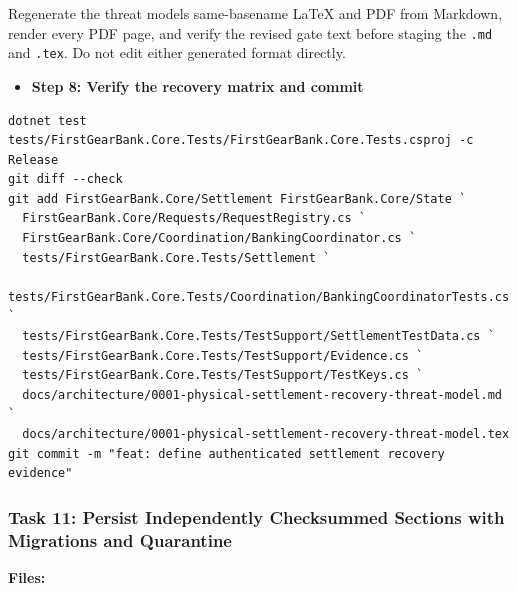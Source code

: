 \documentclass[
  10pt,
  letterpaper,
]{article}
\newcommand{\passthrough}[1]{#1}
\providecommand{\tightlist}{%
  \setlength{\itemsep}{0pt}\setlength{\parskip}{0pt}}
\begin{document}
Regenerate the threat model\textquotesingle s same-basename LaTeX and
PDF from Markdown, render every PDF page, and verify the revised gate
text before staging the \passthrough{\lstinline!.md!} and
\passthrough{\lstinline!.tex!}. Do not edit either generated format
directly.

\begin{itemize}
\tightlist
\item[$\square$]
  \textbf{Step 8: Verify the recovery matrix and commit}
\end{itemize}

\begin{lstlisting}
dotnet test tests/FirstGearBank.Core.Tests/FirstGearBank.Core.Tests.csproj -c Release
git diff --check
git add FirstGearBank.Core/Settlement FirstGearBank.Core/State `
  FirstGearBank.Core/Requests/RequestRegistry.cs `
  FirstGearBank.Core/Coordination/BankingCoordinator.cs `
  tests/FirstGearBank.Core.Tests/Settlement `
  tests/FirstGearBank.Core.Tests/Coordination/BankingCoordinatorTests.cs `
  tests/FirstGearBank.Core.Tests/TestSupport/SettlementTestData.cs `
  tests/FirstGearBank.Core.Tests/TestSupport/Evidence.cs `
  tests/FirstGearBank.Core.Tests/TestSupport/TestKeys.cs `
  docs/architecture/0001-physical-settlement-recovery-threat-model.md `
  docs/architecture/0001-physical-settlement-recovery-threat-model.tex
git commit -m "feat: define authenticated settlement recovery evidence"
\end{lstlisting}

\subsubsection{Task 11: Persist Independently Checksummed Sections with
Migrations and
Quarantine}\label{task-11-persist-independently-checksummed-sections-with-migrations-and-quarantine}

\textbf{Files:}
\end{document}

